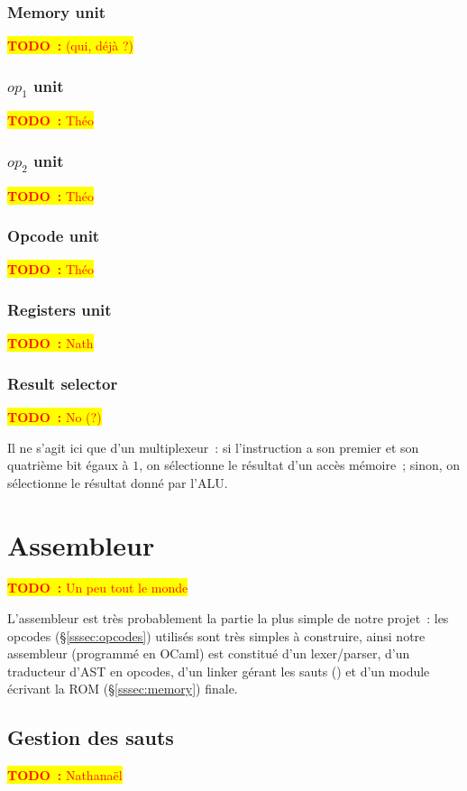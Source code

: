 \documentclass[11pt,a4paper]{article}
\newcommand{\htodo}[1]{\begin{huge}\colorbox{yellow}{\textcolor{red}{\textbf{TODO~:} #1}}\end{huge}}
\newcommand{\todo}[1]{\colorbox{yellow}{\textcolor{red}{\textbf{TODO~:} #1}}}
\begin{document}
\subsubsection{Memory unit}
\todo{(qui, déjà ?)}

\subsubsection{$op_1$ unit}
\todo{Théo}

\subsubsection{$op_2$ unit}
\todo{Théo}

\subsubsection{Opcode unit}
\todo{Théo}

\subsubsection{Registers unit}
\todo{Nath}

\subsubsection{Result selector}
\todo{No (?)}

Il ne s'agit ici que d'un multiplexeur~: si l'instruction a son premier et son quatrième bit égaux à $1$, on sélectionne le résultat d'un accès mémoire~; sinon, on sélectionne le résultat donné par l'ALU.

\section{Assembleur} \label{sec:cas}

\htodo{Un peu tout le monde}

L'assembleur est très probablement la partie la plus simple de notre projet~: les opcodes (§\ref{sssec:opcodes}) utilisés sont très simples à construire, ainsi notre assembleur (programmé en OCaml) est constitué d'un lexer/parser, d'un traducteur d'AST en opcodes, d'un \og linker \fg{} gérant les sauts () et d'un module écrivant la ROM (§\ref{sssec:memory}) finale.

\subsection{Gestion des sauts}
\todo{Nathanaël}
\end{document}
